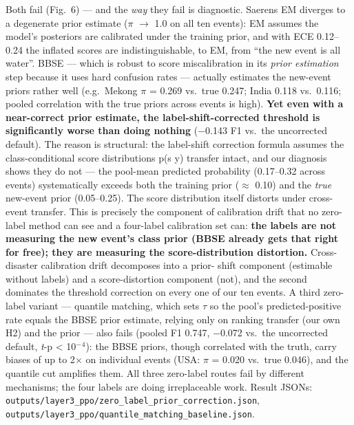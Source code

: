 \documentclass[sn-nature,lineno]{sn-jnl}
\theoremstyle{thmstyleone}
\theoremstyle{thmstyletwo}
\theoremstyle{thmstylethree}
\begin{document}
Both fail (Fig.~6) --- and the \emph{way} they fail is diagnostic. Saerens EM diverges
to a degenerate prior estimate ($\pi$ $\rightarrow$ 1.0 on all ten events): EM assumes
the model's posteriors are calibrated under the training prior, and with
ECE 0.12--0.24 the inflated scores are indistinguishable, to EM, from ``the
new event is all water''. BBSE --- which is robust to score
miscalibration in its \emph{prior estimation} step because it uses hard
confusion rates --- actually estimates the new-event priors rather well
(e.g.~Mekong $\pi$ = 0.269 vs.~true 0.247; India 0.118 vs.~0.116; pooled
correlation with the true priors across events is high). \textbf{Yet even
with a near-correct prior estimate, the label-shift-corrected threshold
is significantly worse than doing nothing} ($-$0.143 F1 vs.~the
uncorrected default). The reason is structural: the label-shift
correction formula assumes the class-conditional score distributions
p(s \textbar{} y) transfer intact, and our diagnosis shows they do not --- the
pool-mean predicted probability (0.17--0.32 across events) systematically
exceeds both the training prior ($\approx$ 0.10) and the \emph{true} new-event prior
(0.05--0.25). The score distribution itself distorts under cross-event
transfer. This is precisely the component of calibration drift that no
zero-label method can see and a four-label calibration set can: \textbf{the
labels are not measuring the new event's class prior (BBSE already
gets that right for free); they are measuring the score-distribution
distortion.} Cross-disaster calibration drift decomposes into a prior-
shift component (estimable without labels) and a score-distortion
component (not), and the second dominates the threshold correction on
every one of our ten events. A third zero-label variant --- quantile
matching, which sets $\tau$ so the pool's predicted-positive rate equals the
BBSE prior estimate, relying only on ranking transfer (our own H2) and
the prior --- also fails (pooled F1 0.747, $-$0.072 vs.~the uncorrected
default, \emph{t}-p \textless{} 10$^{-}$$^{4}$): the BBSE priors, though correlated with the
truth, carry biases of up to 2$\times$ on individual events (USA: $\pi$ = 0.020
vs.~true 0.046), and the quantile cut amplifies them. All three
zero-label routes fail by different mechanisms; the four labels are
doing irreplaceable work. Result JSONs:
\texttt{outputs/layer3\_ppo/zero\_label\_prior\_correction.json},
\texttt{outputs/layer3\_ppo/quantile\_matching\_baseline.json}.
\end{document}
